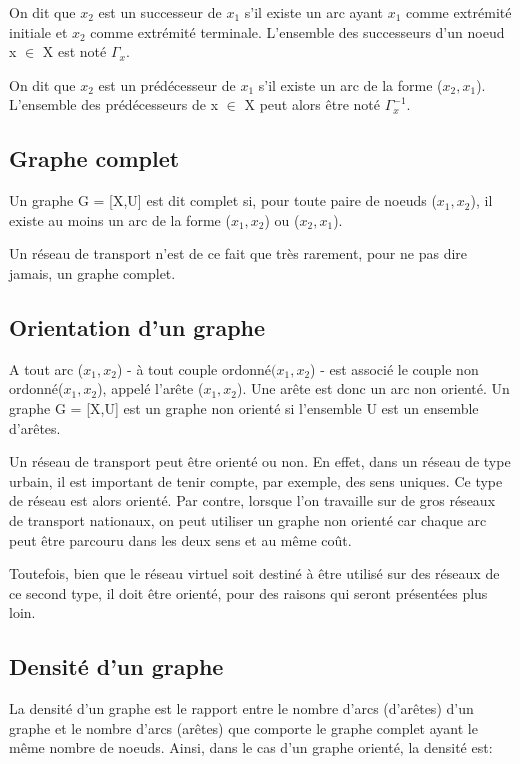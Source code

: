 On dit que $x_2$ est un successeur de $x_1$ s'il existe un arc
ayant $x_1$ comme extrémité initiale et $x_2$ comme extrémité
terminale. L'ensemble des successeurs d'un noeud x $\in$ X est noté
$\Gamma_x$.

On dit que $x_2$ est un prédécesseur de $x_1$ s'il existe un arc de
la forme ($x_2,x_1$). L'ensemble des prédécesseurs de x $\in$ X
peut alors être noté $\Gamma_x^{-1}$.

\subsection{Graphe complet}

Un graphe G = [X,U] est dit complet si, pour toute paire de noeuds
($x_1,x_2$), il existe au moins un arc de la forme ($x_1,x_2$) ou
($x_2,x_1$).

Un réseau de transport n'est de ce fait que très rarement, pour ne
pas dire jamais, un graphe complet.

\subsection{Orientation d'un graphe}

A tout arc ($x_1,x_2$) - à tout couple ordonné$(x_1,x_2$) - est
associé le couple non ordonné($x_1,x_2$), appelé l'arête
($x_1,x_2$). Une arête est donc un arc non orienté. Un graphe G =
[X,U] est un graphe non orienté si l'ensemble U est un ensemble
d'arêtes.

Un réseau de transport peut être orienté ou non. En effet, dans un
réseau de type urbain, il est important de tenir compte, par
exemple, des sens uniques. Ce type de réseau est alors orienté. Par
contre, lorsque l'on travaille sur de gros réseaux de transport
nationaux, on peut utiliser un graphe non orienté car chaque arc
peut être parcouru dans les deux sens et au même coût.

Toutefois, bien que le réseau virtuel soit destiné à être utilisé
sur des réseaux de ce second type, il doit être orienté, pour des
raisons qui seront présentées plus loin.

\subsection{Densit\'e d'un graphe}

La densité d'un graphe est le rapport entre le nombre d'arcs
(d'arêtes) d'un graphe et le nombre d'arcs (arêtes) que comporte le
graphe complet ayant le même nombre de noeuds. Ainsi, dans le cas
d'un graphe orienté, la densité est:


